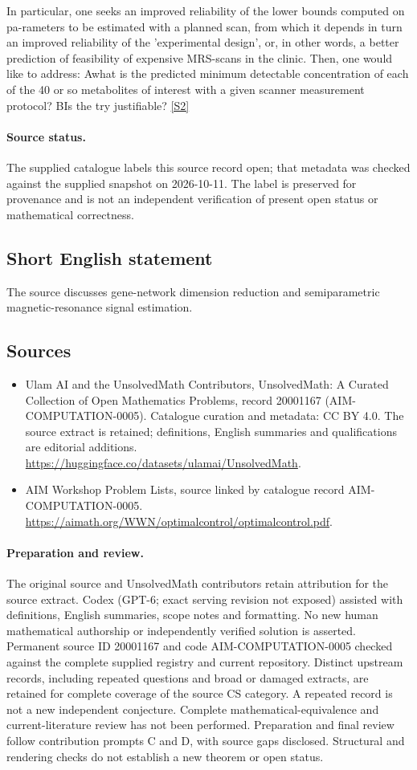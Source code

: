 \documentclass[11pt]{article}
\newcommand{\sref}[2]{\hyperlink{source:#1:#2}{[S#2]}}
\begin{document}
In particular, one seeks an improved reliability of the lower bounds computed on pa-rameters to be estimated with a planned scan, from which it depends in turn an improved reliability of the 'experimental design', or, in other words, a better prediction of feasibility of expensive MRS-scans in the clinic. Then, one would like to address: Awhat is the predicted minimum detectable concentration of each of the 40 or so metabolites of interest with a given scanner measurement protocol? BIs the try justifiable? \sref{20001167}{2}
\paragraph{Source status.}
The supplied catalogue labels this source record open; that metadata was checked against the supplied snapshot on 2026-10-11. The label is preserved for provenance and is not an independent verification of present open status or mathematical correctness.
\subsection{Short English statement}
The source discusses gene-network dimension reduction and semiparametric magnetic-resonance signal estimation.
\subsection{Sources}
\begin{itemize}
\item[\hypertarget{source:20001167:1}{S1}] Ulam AI and the UnsolvedMath Contributors, UnsolvedMath: A Curated Collection of Open Mathematics Problems, record 20001167 (AIM-COMPUTATION-0005). Catalogue curation and metadata: CC BY 4.0. The source extract is retained; definitions, English summaries and qualifications are editorial additions.
\url{https://huggingface.co/datasets/ulamai/UnsolvedMath}.
\item[\hypertarget{source:20001167:2}{S2}] AIM Workshop Problem Lists, source linked by catalogue record AIM-COMPUTATION-0005.
\url{https://aimath.org/WWN/optimalcontrol/optimalcontrol.pdf}.
\end{itemize}
\paragraph{Preparation and review.}
The original source and UnsolvedMath contributors retain attribution for the source extract. Codex (GPT-6; exact serving revision not exposed) assisted with definitions, English summaries, scope notes and formatting. No new human mathematical authorship or independently verified solution is asserted. Permanent source ID 20001167 and code AIM-COMPUTATION-0005 checked against the complete supplied registry and current repository. Distinct upstream records, including repeated questions and broad or damaged extracts, are retained for complete coverage of the source CS category. A repeated record is not a new independent conjecture. Complete mathematical-equivalence and current-literature review has not been performed. Preparation and final review follow contribution prompts C and D, with source gaps disclosed. Structural and rendering checks do not establish a new theorem or open status.
\label{end:20001167}
\end{document}
